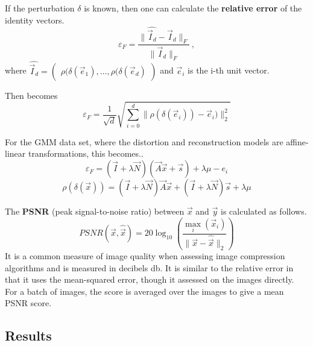 If the perturbation $\delta$ is known, then one can calculate the \textbf{relative error} of the identity vectors. 
\begin{equation}
\label{eqn:relerror}
    \varepsilon_F = \frac {\|\widehat {\vec I_d} - \vec I_d\|_F} {\|\vec I_d\|_F} \,,
\end{equation}
where $\widehat {\vec I_d} = \begin{pmatrix} \rho (\delta (\vec e_1), \dots, \rho (\delta (\vec e_d) \end{pmatrix}$ and $\vec e_i$ is the i-th unit vector.

Then  becomes
\[
    \varepsilon_F = \frac 1 {\sqrt d} \sqrt{ \sum_{i=0}^d \|\rho (\delta (\vec e_i)) - \vec e_i)\|_2^2}
\]

For the GMM data set, where the distortion and reconstruction models are affine-linear transformations,
this becomes..
\[
    \varepsilon_F = (\vec I + \lambda \vec N) (\vec A \vec x + \vec s) + \lambda \mu  - e_i 
\]
\[
    \rho ( \delta ( \vec x)) = (\vec I + \lambda \vec N) \vec A \vec x +(\vec I + \lambda \vec N) \vec s + \lambda \mu 
\]

The \textbf{PSNR} (peak signal-to-noise ratio) between $\vec x$ and $\vec y$ is calculated as follows.
\[
    PSNR(\vec x, \hat {\vec x}) = 20 \log_{10} \left (\frac {\max_i(\vec x_i)} {\|\vec x-\hat {\vec x}\|_2} \right )
\]
It is a common measure of image quality when assessing image compression algorithms and is measured in decibels db.
It is similar to the relative error in that it uses the mean-squared error, though it assessed on the images directly.
For a batch of images, the score is averaged over the images to give a mean PSNR score.

\subsection{Results}

